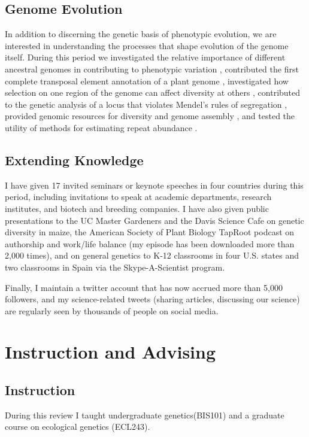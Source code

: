 \documentclass[letterpaper,10pt]{article}
\begin{document}
\subsection*{Genome Evolution}
In addition to discerning the genetic basis of phenotypic evolution, we are interested in  understanding the processes that shape evolution of the genome itself.
During this period we investigated the relative importance of different ancestral genomes in contributing to phenotypic variation \cite{renny2017gene}, contributed the first complete transposal element annotation of a plant genome \cite{jiao2017improved}, investigated how selection on one region of the genome can affect diversity at others \cite{beissinger2016recent}, contributed to the genetic analysis of a locus that violates Mendel's rules of segregation \cite{dawe2018kinesin}, provided genomic resources for diversity \cite{bukowski2017construction} and genome assembly \cite{jiao2017improved,wolfgruber2016high}, and tested the utility of methods for estimating repeat abundance \cite{bilinski2017genomic}.

\subsection*{Extending Knowledge}

I have given 17 invited seminars or keynote speeches in four countries during this period, including invitations to speak at academic departments, research institutes, and biotech and breeding companies.
I have also given public presentations to the UC Master Gardeners and the Davis Science Cafe on genetic diversity in maize, the American Society of Plant Biology TapRoot podcast on authorship and work/life balance (my episode has been downloaded more than 2,000 times), and on general genetics to K-12 classrooms in four U.S. states and two classrooms in Spain via the Skype-A-Scientist program.

Finally, I maintain a twitter account that has now accrued more than 5,000 followers, and my science-related tweets (sharing articles, discussing our science) are regularly seen by thousands of people on social media.

\section*{Instruction and Advising}

\subsection*{Instruction}
During this review I taught undergraduate genetics(BIS101) and a graduate course on ecological genetics (ECL243).
\end{document}
